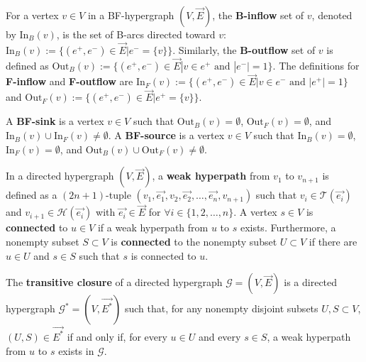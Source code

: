 \documentclass{comnet}%
\begin{document}
\begin{definition}
	For a vertex $v \in V$ in a BF-hypergraph $(V, \overrightarrow{E})$, the \textbf{B-inflow} set of $v$, denoted by $\text{In}_{B}(v)$, is the set of B-arcs directed toward $v$: $\text{In}_{B}(v) := \{ (e^{+}, e^{-}) \in \overrightarrow{E} | e^{-} = \{ v \} \}$. Similarly, the \textbf{B-outflow} set of $v$ is defined as $\text{Out}_{B}(v) := \{ (e^{+}, e^{-}) \in \overrightarrow{E} | v \in e^{+} \text{\ and\ } |e^{-}| = 1\}$. The definitions for \textbf{F-inflow} and \textbf{F-outflow} are $\text{In}_{F}(v) := \{ (e^{+}, e^{-}) \in \overrightarrow{E} | v \in e^{-} \text{\ and\ } |e^{+}| = 1\}$ and $\text{Out}_{F}(v) := \{ (e^{+}, e^{-}) \in \overrightarrow{E} | e^{+} = \{ v \} \}$.\\ 
\end{definition}

\begin{definition}
	A \textbf{BF-sink} is a vertex $v \in V$ such that $\text{Out}_{B}(v) = \emptyset$, $\text{Out}_{F}(v) = \emptyset$, and $\text{In}_{B}(v) \cup \text{In}_{F}(v) \not= \emptyset$. A \textbf{BF-source} is a vertex $v \in V$ such that $\text{In}_{B}(v) = \emptyset$, $\text{In}_{F}(v) = \emptyset$, and $\text{Out}_{B}(v) \cup \text{Out}_{F}(v) \not= \emptyset$. \\ 
\end{definition}

\begin{definition}
	In a directed hypergraph $(V, \overrightarrow{E})$, a \textbf{weak hyperpath} from $v_{1}$ to $v_{n+1}$ is defined as a $(2n+1)$-tuple $(v_{1}, \overrightarrow{e_{1}}, v_{2}, \overrightarrow{e_{2}}, \dots, \overrightarrow{e_{n}}, v_{n+1})$ such that $v_{i} \in \mathcal{T}(\overrightarrow{e_{i}})$ and $v_{i+1} \in \mathcal{H}(\overrightarrow{e_{i}})$ with $\overrightarrow{e_{i}} \in \overrightarrow{E}$ for $\forall i \in \{ 1, 2, \dots, n\}$. A vertex $s \in V$ is \textbf{connected} to $u \in V$ if a weak hyperpath from $u$ to $s$ exists. 
	Furthermore, a nonempty subset $S \subset V$ is \textbf{connected} to the nonempty subset $U \subset V$ if there are $u \in U$ and $s \in S$ such that $s$ is connected to $u$.\\
\end{definition}

\begin{definition}
	The \textbf{transitive closure} of a directed hypergraph $\mathcal{G} = (V, \overrightarrow{E})$ is a directed hypergraph $\mathcal{G}^{*}=(V, \overrightarrow{E^{*}})$ such that, for any nonempty disjoint subsets $U, S \subset V$, $(U,S) \in \overrightarrow{E^{*}}$ if and only if, for every $u\in U$ and every $s\in S$, a weak hyperpath from $u$ to $s$ exists in $\mathcal{G}$.\\
\end{definition}
\end{document}

